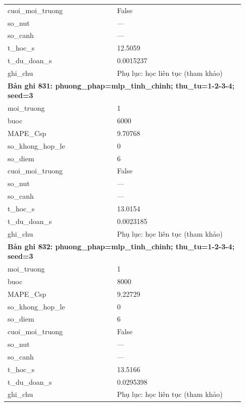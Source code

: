 \begin{longtable}{p{0.43\linewidth}p{0.50\linewidth}}
cuoi\_\allowbreak moi\_\allowbreak truong & False \\
so\_\allowbreak nut & — \\
so\_\allowbreak canh & — \\
t\_\allowbreak hoc\_\allowbreak s & 12.5059 \\
t\_\allowbreak du\_\allowbreak doan\_\allowbreak s & 0.0015237 \\
ghi\_\allowbreak chu & Phụ lục: học liên tục (tham khảo) \\
\midrule
\multicolumn{2}{p{0.95\linewidth}}{\textbf{Bản ghi 831: phuong\_phap=mlp\_tinh\_chinh; thu\_tu=1-2-3-4; seed=3}} \\
moi\_\allowbreak truong & 1 \\
buoc & 6000 \\
MAPE\_\allowbreak Csp & 9.70768 \\
so\_\allowbreak khong\_\allowbreak hop\_\allowbreak le & 0 \\
so\_\allowbreak diem & 6 \\
cuoi\_\allowbreak moi\_\allowbreak truong & False \\
so\_\allowbreak nut & — \\
so\_\allowbreak canh & — \\
t\_\allowbreak hoc\_\allowbreak s & 13.0154 \\
t\_\allowbreak du\_\allowbreak doan\_\allowbreak s & 0.0023185 \\
ghi\_\allowbreak chu & Phụ lục: học liên tục (tham khảo) \\
\midrule
\multicolumn{2}{p{0.95\linewidth}}{\textbf{Bản ghi 832: phuong\_phap=mlp\_tinh\_chinh; thu\_tu=1-2-3-4; seed=3}} \\
moi\_\allowbreak truong & 1 \\
buoc & 8000 \\
MAPE\_\allowbreak Csp & 9.22729 \\
so\_\allowbreak khong\_\allowbreak hop\_\allowbreak le & 0 \\
so\_\allowbreak diem & 6 \\
cuoi\_\allowbreak moi\_\allowbreak truong & False \\
so\_\allowbreak nut & — \\
so\_\allowbreak canh & — \\
t\_\allowbreak hoc\_\allowbreak s & 13.5166 \\
t\_\allowbreak du\_\allowbreak doan\_\allowbreak s & 0.0295398 \\
ghi\_\allowbreak chu & Phụ lục: học liên tục (tham khảo) \\

\end{longtable}
